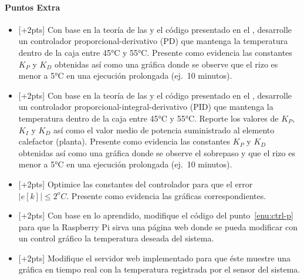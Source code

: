 \paragraph{Puntos Extra}
\begin{itemize}
	\item{} [+2pts] Con base en la teoría de las  y el código presentado en el , desarrolle un controlador proporcional-derivativo (PD) que mantenga la temperatura dentro de la caja entre 45°C y 55°C.
	Presente como evidencia las constantes $K_P$ y $K_D$ obtenidas así como una gráfica donde se observe que el rizo es menor a 5°C en una ejecución prolongada (ej.~10 minutos).

	\item{} [+2pts] Con base en la teoría de las  y el código presentado en el , desarrolle un controlador proporcional-integral-derivativo (PID) que mantenga la temperatura dentro de la caja entre 45°C y 55°C.
	Reporte los valores de $K_P$, $K_I$ y $K_D$ así como el valor medio de potencia suministrado al elemento calefactor (planta).
	Presente como evidencia las constantes $K_P$ y $K_D$ obtenidas así como una gráfica donde se observe el sobrepaso y que el rizo es menor a 5°C en una ejecución prolongada (ej.~10 minutos).

	\item{} [+2pts] Optimice las constantes del controlador para que el error $\big\lvert e[k]\big\rvert \leq 2^{o}C$.
	Presente como evidencia las gráficas correspondientes.

	\item{} [+2pts] Con base en lo aprendido, modifique el código del punto~\ref{enu:ctrl-p} para que la Raspberry Pi sirva una página web donde se pueda modificar con un control gráfico la temperatura deseada del sistema.

	\item{} [+2pts] Modifique el servidor web implementado para que éste muestre una gráfica en tiempo real con la temperatura registrada por el sensor del sistema.

\end{itemize}